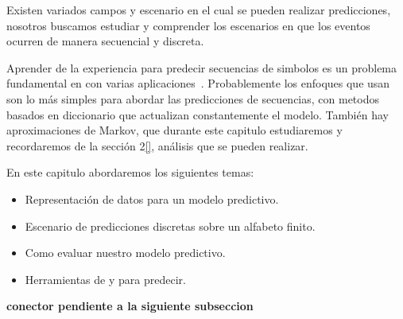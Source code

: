 Existen variados campos y escenario en el cual se pueden realizar predicciones, nosotros buscamos estudiar y comprender los escenarios en que los eventos ocurren de manera secuencial y discreta. 

Aprender de la experiencia para predecir secuencias de simbolos es un problema fundamental en \machinelearning con varias aplicaciones~\cite{Laird1994}. Probablemente los enfoques que usan \losslessdatacompression son lo más simples para abordar las predicciones de secuencias, con metodos basados en diccionario que actualizan constantemente el modelo. También hay aproximaciones de Markov, que durante este capitulo estudiaremos y recordaremos de la sección 2\ref{}, análisis que se pueden realizar.






En este capitulo abordaremos los siguientes temas:

\begin{itemize}
	\item Representación de datos para un modelo predictivo.
	\item Escenario de predicciones discretas sobre un alfabeto finito.
	\item Como evaluar nuestro modelo predictivo.
	\item Herramientas de \machinelearning y \losslessdatacompression para predecir.
\end{itemize}




\textbf{conector pendiente a la siguiente subseccion}